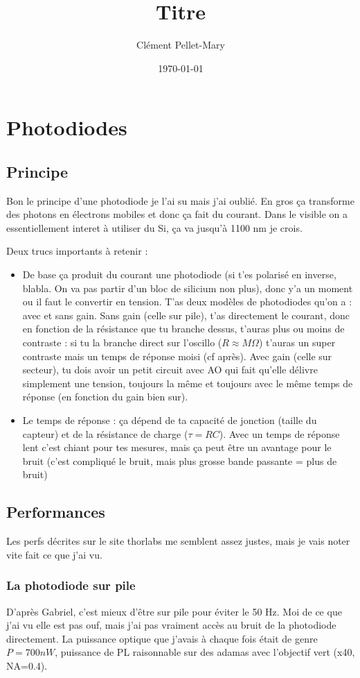\documentclass[a4paper]{report}
\title{Titre}
\author{Clément Pellet-Mary}
\date\today
\begin{document}
\chapter{Photodiodes}
  \section{Principe}
  Bon le principe d'une photodiode je l'ai su mais j'ai oublié. En gros ça transforme des photons en électrons mobiles et donc ça fait du courant. Dans le visible on a essentiellement interet à utiliser du Si, ça va jusqu'à 1100 nm je crois.
  
  Deux trucs importants à retenir :
  \begin{itemize}
  \item De base ça produit du courant une photodiode (si t'es polarisé en inverse, blabla. On va pas partir d'un bloc de silicium non plus), donc y'a un moment ou il faut le convertir en tension. T'as deux modèles de photodiodes qu'on a : avec et sans gain. Sans gain (celle sur pile), t'as directement le courant, donc en fonction de la résistance que tu branche dessus, t'auras plus ou moins de contraste : si tu la branche direct sur l'oscillo ($R\approx M\Omega$) t'auras un super contraste mais un temps de réponse moisi (cf après). Avec gain (celle sur secteur), tu dois avoir un petit circuit avec AO qui fait qu'elle délivre simplement une tension, toujours la même et toujours avec le même temps de réponse (en fonction du gain bien sur).
  \item Le temps de réponse : ça dépend de ta capacité de jonction (taille du capteur) et de la résistance de charge ($\tau=RC$). Avec un temps de réponse lent c'est chiant pour tes mesures, mais ça peut être un avantage pour le bruit (c'est compliqué le bruit, mais plus grosse bande passante = plus de bruit)
  \end{itemize}
  \section{Performances}
  Les perfs décrites sur le site thorlabs me semblent assez justes, mais je vais noter vite fait ce que j'ai vu.
  
  \subsection{La photodiode sur pile}
  D'après Gabriel, c'est mieux d'être sur pile pour éviter le 50 Hz. Moi de ce que j'ai vu elle est pas ouf, mais j'ai pas vraiment accès au bruit de la photodiode directement.
  La puissance optique que j'avais à chaque fois était de genre $P=700 nW$, puissance de PL raisonnable sur des adamas avec l'objectif vert (x40, NA=0.4).
  
\end{document}

